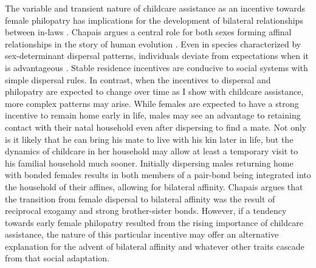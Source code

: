 The variable and transient nature of childcare assistance as an incentive towards female philopatry has implications for the development of bilateral relationships between in-laws \cite{rodseth1991human}.  Chapais argues a central role for both sexes forming affinal relationships in the story of human evolution \cite{chapais2009primeval}.  Even in species characterized by sex-determinant dispersal patterns, individuals deviate from expectations when it is advantageous \cite{pusey1997influence}.  Stable residence incentives are conducive to social systems with simple dispersal rules.  In contrast, when the incentives to dispersal and philopatry are expected to change over time as I show with childcare assistance, more complex patterns may arise.  While females are expected to have a strong incentive to remain home early in life, males may see an advantage to retaining contact with their natal household even after dispersing to find a mate.  Not only is it likely that he can bring his mate to live with his kin later in life, but the dynamics of childcare in her household may allow at least a temporary visit to his familial household much sooner.  Initially dispersing males returning home with bonded females results in both members of a pair-bond being integrated into the household of their affines, allowing for bilateral affinity.  Chapais argues that the transition from female dispersal to bilateral affinity was the result of reciprocal exogamy and strong brother-sister bonds.  However, if a tendency towards early female philopatry resulted from the rising importance of childcare assistance, the nature of this particular incentive may offer an alternative explanation for the advent of bilateral affinity and whatever other traits cascade from that social adaptation.







